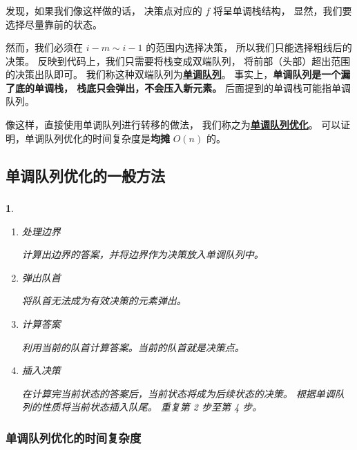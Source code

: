 \documentclass[9pt, UTF8]{beamer} %
\newcommand \fts {\frametitle{\insertsubsection}}
\newcommand \bpause { \bigskip \pause }
\newtheorem*{bbox}{}
\begin{document}
	\begin{frame}
		\fts

		发现，如果我们像这样做的话，
		决策点对应的 $f$ 将呈单调栈结构，
		显然，我们要选择尽量靠前的状态。

		\bpause

		然而，我们必须在 $i - m \sim i - 1$ 的范围内选择决策，
		所以我们只能选择粗线后的决策。
		反映到代码上，我们只需要将栈变成双端队列，
		将前部（头部）超出范围的决策出队即可。
		我们称这种双端队列为\textbf{\uline{单调队列}}。
		事实上，\textbf{单调队列是一个漏了底的单调栈，
		栈底只会弹出，不会压入新元素。}
		后面提到的单调栈可能指单调队列。

		\bpause

		像这样，直接使用单调队列进行转移的做法，
		我们称之为\textbf{\uline{单调队列优化}}。
		可以证明，单调队列优化的时间复杂度是\textbf{均摊} $O(n)$ 的。
	\end{frame}

	\subsection{单调队列优化的一般方法}

	\begin{frame}
		\fts
		\begin{bbox}
			\begin{enumerate}
				\item 处理边界

				计算出边界的答案，并将边界作为决策放入单调队列中。

				\item 弹出队首

				将队首无法成为有效决策的元素弹出。

				\item 计算答案

				利用当前的队首计算答案。当前的队首就是决策点。

				\item 插入决策

				在计算完当前状态的答案后，当前状态将成为后续状态的决策。
				根据单调队列的性质将当前状态插入队尾。
				重复第 2 步至第 4 步。
			\end{enumerate}
		\end{bbox}
	\end{frame}

	\subsubsection{单调队列优化的时间复杂度}
\end{document}
